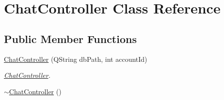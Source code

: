 \hypertarget{classChatController}{}\section{Chat\+Controller Class Reference}
\label{classChatController}
\subsection*{Public Member Functions}
\begin{DoxyCompactItemize}
\item 
\hyperlink{classChatController_a181a7671ad22b30bba6ece9953af6849}{Chat\+Controller} (Q\+String db\+Path, int account\+Id)
\begin{DoxyCompactList}\small\item\em \hyperlink{classChatController}{Chat\+Controller}. \end{DoxyCompactList}\item 
\hyperlink{classChatController_adc6b7a21ada76423568c93f631bb3eeb}{$\sim$\+Chat\+Controller} ()\hypertarget{classChatController_adc6b7a21ada76423568c93f631bb3eeb}{}\label{classChatController_adc6b7a21ada76423568c93f631bb3eeb}


\end{DoxyCompactItemize}
